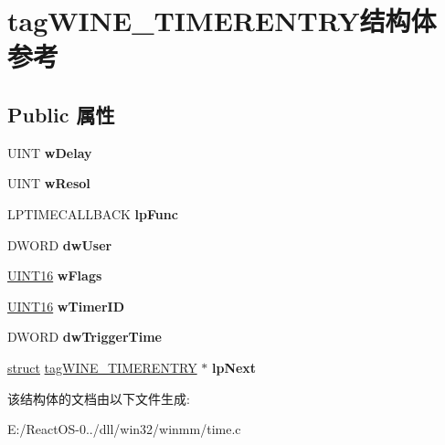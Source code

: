 \hypertarget{structtag_w_i_n_e___t_i_m_e_r_e_n_t_r_y}{}\section{tag\+W\+I\+N\+E\+\_\+\+T\+I\+M\+E\+R\+E\+N\+T\+R\+Y结构体 参考}
\label{structtag_w_i_n_e___t_i_m_e_r_e_n_t_r_y}
\subsection*{Public 属性}
\begin{DoxyCompactItemize}
\item 
\mbox{\label{structtag_w_i_n_e___t_i_m_e_r_e_n_t_r_y_a4456737fb243c5e42ba2950eaa257ad0}} 
U\+I\+NT {\bfseries w\+Delay}
\item 
\mbox{\label{structtag_w_i_n_e___t_i_m_e_r_e_n_t_r_y_abb0f477b09328deeb41795e7a31789d3}} 
U\+I\+NT {\bfseries w\+Resol}
\item 
\mbox{\label{structtag_w_i_n_e___t_i_m_e_r_e_n_t_r_y_a160bac2aaffad1c06477a095152c4aae}} 
L\+P\+T\+I\+M\+E\+C\+A\+L\+L\+B\+A\+CK {\bfseries lp\+Func}
\item 
\mbox{\label{structtag_w_i_n_e___t_i_m_e_r_e_n_t_r_y_a8cd39992d24fbf0a09275df38807fece}} 
D\+W\+O\+RD {\bfseries dw\+User}
\item 
\mbox{\label{structtag_w_i_n_e___t_i_m_e_r_e_n_t_r_y_a49c5278acb14938e04262dfdb7c61ac8}} 
\hyperlink{_processor_bind_8h_a09f1a1fb2293e33483cc8d44aefb1eb1}{U\+I\+N\+T16} {\bfseries w\+Flags}
\item 
\mbox{\label{structtag_w_i_n_e___t_i_m_e_r_e_n_t_r_y_ae51534a2094c69eff51d519b02ce00f9}} 
\hyperlink{_processor_bind_8h_a09f1a1fb2293e33483cc8d44aefb1eb1}{U\+I\+N\+T16} {\bfseries w\+Timer\+ID}
\item 
\mbox{\label{structtag_w_i_n_e___t_i_m_e_r_e_n_t_r_y_a8f5f1657cd974e0c3eb7bae114e13e79}} 
D\+W\+O\+RD {\bfseries dw\+Trigger\+Time}
\item 
\mbox{\label{structtag_w_i_n_e___t_i_m_e_r_e_n_t_r_y_a4efef79ee4d5b4aacfa72df2fcc73cc6}} 
\hyperlink{interfacestruct}{struct} \hyperlink{structtag_w_i_n_e___t_i_m_e_r_e_n_t_r_y}{tag\+W\+I\+N\+E\+\_\+\+T\+I\+M\+E\+R\+E\+N\+T\+RY} $\ast$ {\bfseries lp\+Next}
\end{DoxyCompactItemize}


该结构体的文档由以下文件生成\+:\begin{DoxyCompactItemize}
\item 
E\+:/\+React\+O\+S-\/0../dll/win32/winmm/time.\+c\end{DoxyCompactItemize}
